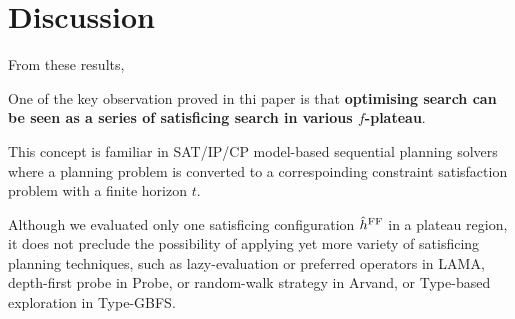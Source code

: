 \clearpage 
\section{Discussion}
\label{sec:discussion}
From these results, 

One of the key observation proved in thi paper is that
\textbf{optimising search can be seen as a series of satisficing search
in various $f$-plateau}. 

This concept is familiar in
SAT/IP/CP model-based sequential planning solvers where a planning
problem is converted to a correspoinding constraint satisfaction problem
with a finite horizon $t$.

Although we evaluated only one satisficing configuration $\hat{h}^{\text{FF}}$ in a
plateau region, it does not preclude the possibility of applying yet
more variety of satisficing planning techniques, such as lazy-evaluation
or preferred operators in LAMA, depth-first probe in Probe, or
random-walk strategy in Arvand, or Type-based exploration in Type-GBFS.

